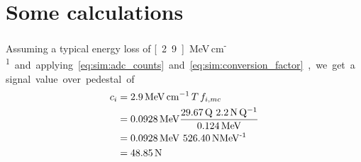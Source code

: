 \documentclass[11pt]{article}
\def\MeV#1{\unit[#1]{MeV}}
\def\N#1{\unit[#1]{N}}
\def\Q#1{\unit[#1]{Q}}
\begin{document}
\section*{Some calculations} 

Assuming a typical energy loss of \unit[2.9]{MeV\,cm\textsuperscript{-1}} and
applying \eqref{eq:sim:adc_counts} and
\eqref{eq:sim:conversion_factor}, we get a signal value over pedestal of
\begin{align}
  c_i &= \unit[2.9]{MeV\,cm^{-1}}\,T\, f_{i,mc}\nonumber\\
  &= \MeV{0.0928}\frac{\Q{29.67}\
    \unit[2.2]{N\,Q^{-1}}}{\MeV{0.124}}\nonumber\\
  &= \MeV{0.0928}\ \unit[526.40]{N MeV\textsuperscript{-1}}\nonumber\\
  &= \N{48.85}
\end{align}
\end{document}
